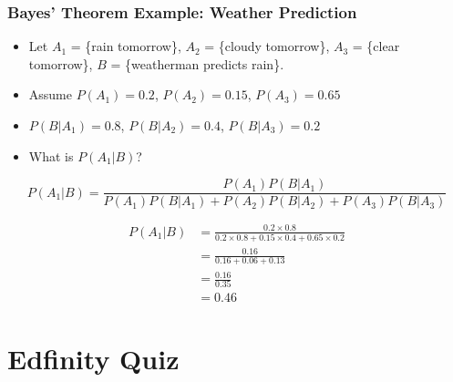 \documentclass[slidestop,compress,mathserif]{beamer}
\begin{document}
\begin{frame}
\frametitle{Bayes' Theorem Example: Weather Prediction}

\begin{itemize}
	\item Let $A_1$ = \{rain tomorrow\}, $A_2$ = \{cloudy tomorrow\}, $A_3$ = \{clear tomorrow\}, $B$ = \{weatherman predicts rain\}.
	\item Assume $P(A_1) = 0.2$, $P(A_2) = 0.15$, $P(A_3) = 0.65$
	\item $P(B|A_1) = 0.8$, $P(B|A_2) = 0.4$, $P(B|A_3) = 0.2$
	\item What is $P(A_1|B)$?
\end{itemize}

\vspace{2mm}
\pause
\[
P(A_1|B) = \frac{P(A_1)P(B|A_1)}{P(A_1)P(B|A_1) + P(A_2)P(B|A_2) + P(A_3)P(B|A_3)}
\]

\begin{align*}
P(A_1|B) &= \frac{0.2 \times 0.8}{0.2 \times 0.8 + 0.15 \times 0.4 + 0.65 \times 0.2} \\
				&= \frac{0.16}{0.16 + 0.06 + 0.13} \\
				&= \frac{0.16}{0.35} \\
				&= 0.46
\end{align*}
\end{frame}


\section{Edfinity Quiz}


\end{document}
